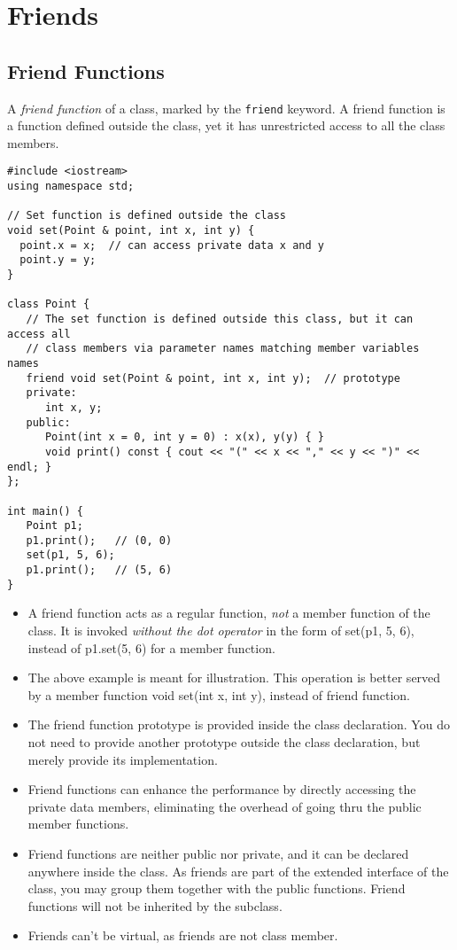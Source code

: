 
\chapter{Friends}

\section{Friend Functions}



A \textit{friend function} of a class, 
marked by the \lstinline{friend} keyword.
A friend function is a function defined outside the class, 
yet it has unrestricted access to all the class members.


\begin{lstlisting}
#include <iostream>
using namespace std;

// Set function is defined outside the class
void set(Point & point, int x, int y) {
  point.x = x;  // can access private data x and y
  point.y = y;
}

class Point {
   // The set function is defined outside this class, but it can access all
   // class members via parameter names matching member variables names 
   friend void set(Point & point, int x, int y);  // prototype
   private:
      int x, y;
   public:
      Point(int x = 0, int y = 0) : x(x), y(y) { }
      void print() const { cout << "(" << x << "," << y << ")" << endl; }
};
 
int main() {
   Point p1;
   p1.print();   // (0, 0)
   set(p1, 5, 6);
   p1.print();   // (5, 6)
}
\end{lstlisting}



\begin{itemize}   
\renewcommand{\labelitemi}{$\Box$}
\item A friend function acts as a regular function, \textit{not} a 
member function of the class. It is invoked \textit{without the dot operator} 
in the form of set(p1, 5, 6), instead of p1.set(5, 6) for a member function.
\item The above example is meant for illustration. 
This operation is better served by a member function void set(int x, int y), instead of friend function.
\item The friend function prototype is provided inside the class declaration. 
You do not need to provide another prototype outside the class declaration, 
but merely provide its implementation.
\item Friend functions can enhance the performance by directly accessing the 
private data members, eliminating the overhead of going thru the public member functions.
\item Friend functions are neither public nor private, and it can be declared anywhere 
inside the class. As friends are part of the extended interface of the class, 
you may group them together with the public functions.
Friend functions will not be inherited by the subclass. 
\item Friends can't be virtual, as friends are not class member.
\end{itemize}


